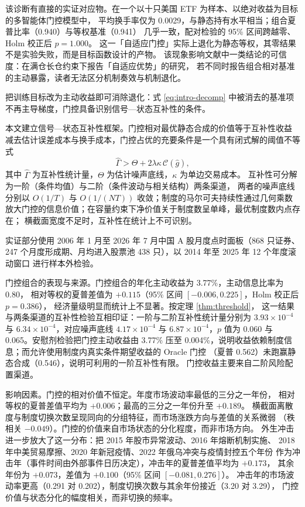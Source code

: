 该诊断有直接的实证对应物。在一个以十只美国 ETF 为样本、以绝对收益为目标的多智能体门控模型中，
平均换手率仅为 0.0029，与静态持有水平相当；组合夏普比率（0.940）与等权基准（0.941）
几乎一致，配对检验的 95\% 区间跨越零、Holm 校正后 $p=1.000$。
这一「自适应门控」实际上退化为静态等权，其零结果不是实验失败，而是目标函数设计的产物。
该现象影响文献中一类结论的可信度：在满仓长仓约束下报告「自适应优势」的研究，
若不同时报告组合相对基准的主动暴露，读者无法区分机制奏效与机制退化。

把训练目标改为主动收益即可消除退化：式 \eqref{eq:intro-decomp} 中被消去的基准项
不再主导梯度，门控具备识别信号—状态互补性的条件。

本文建立信号—状态互补性框架。门控相对最优静态合成的价值等于互补性收益
减去估计误差成本与换手成本，门控占优的充要条件是一个具有闭式解的阈值不等式
\begin{equation}
\hat\Gamma>\Theta+2\lambda\kappa\,\mathcal{C}(\hat g),
\label{eq:intro-threshold}
\end{equation}
其中 $\hat\Gamma$ 为互补性统计量，$\Theta$ 为估计噪声底线，$\kappa$ 为单边交易成本。
互补性可分解为一阶（条件均值）与二阶（条件波动与相关结构）两条渠道，
两者的噪声底线分别以 $O(1/T)$ 与 $O(1/(NT))$ 收敛；制度的马尔可夫持续性通过几何乘数
放大门控的信息价值；在容量约束下净价值关于制度数呈单峰，最优制度数内点存在；
横截面宽度不足时，互补性在统计上不可识别。

实证部分使用 2006 年 1 月至 2026 年 7 月中国 A 股月度点时面板（868 只证券、
247 个月度形成期、月均进入股票池 438 只），以 2014 年至 2025 年 12 个年度滚动窗口
进行样本外检验。

门控组合的表现与来源。门控组合的年化主动收益为 3.77\%，主动信息比率为 0.80，
相对等权的夏普差值为 $+0.115$（95\% 区间 $[-0.006,0.225]$，Holm 校正后 $p=0.386$），
经济量级明显而统计上不显著。按定理 \ref{thm:threshold}，
这一结果与两条渠道的互补性检验互相印证：一阶与二阶互补性统计量分别为
$3.93\times10^{-4}$ 与 $6.34\times10^{-4}$，对应噪声底线 $4.17\times10^{-4}$ 与
$6.87\times10^{-4}$，$p$ 值为 0.060 与 0.065。安慰剂检验把门控主动收益由 3.77\% 压至
0.004\%，说明收益依赖制度信息；而允许使用制度内真实条件期望收益的 Oracle 门控
（夏普 0.562）未跑赢静态合成（0.546），说明可利用的一阶互补性有限。
门控收益主要来自二阶风险配置渠道。

影响因素。门控的相对价值不恒定。年度市场波动率最低的三分之一年份，
相对等权的夏普差值平均为 $+0.006$；最高的三分之一年份升至 $+0.189$。
横截面离散度与制度切换次数呈现同向的分组特征，而市场涨跌方向与差值的关系微弱
（秩相关 $-0.049$）。门控的价值来自市场状态的分化程度，而非市场方向。
外生冲击进一步放大了这一分布：把 2015 年股市异常波动、2016 年熔断机制实施、
2018 年中美贸易摩擦、2020 年新冠疫情、2022 年俄乌冲突与疫情封控五个年份
作为冲击年（事件时间由外部事件日历决定），冲击年的夏普差值平均为 $+0.173$，
其余年份为 $+0.073$，差值为 $+0.100$（95\% 区间 $[-0.081,0.276]$）。
冲击年的市场波动率更高（0.291 对 0.202），制度切换次数与其余年份接近（3.20 对 3.29），
门控价值与状态分化的幅度相关，而非切换的频率。

